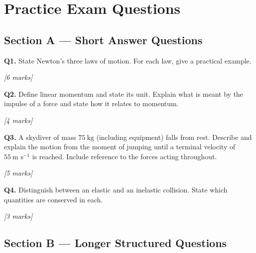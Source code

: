\section{Practice Exam Questions}

\subsection*{Section A --- Short Answer Questions}

\begin{tcolorbox}[colback=white, colframe=midblue, breakable]

\begin{minipage}{\linewidth}
\textbf{Q1.} State Newton's three laws of motion. For each law, give a practical example.
\par\hfill\textit{[6 marks]}
\vspace{5.5cm}
\end{minipage}

\begin{minipage}{\linewidth}
\textbf{Q2.} Define linear momentum and state its unit. Explain what is meant by the impulse of a force and state how it relates to momentum.
\par\hfill\textit{[4 marks]}
\vspace{3.5cm}
\end{minipage}

\begin{minipage}{\linewidth}
\textbf{Q3.} A skydiver of mass $75\ \text{kg}$ (including equipment) falls from rest. Describe and explain the motion from the moment of jumping until a terminal velocity of $55\ \text{m s}^{-1}$ is reached. Include reference to the forces acting throughout.
\par\hfill\textit{[5 marks]}
\vspace{5cm}
\end{minipage}

\begin{minipage}{\linewidth}
\textbf{Q4.} Distinguish between an elastic and an inelastic collision. State which quantities are conserved in each.
\par\hfill\textit{[3 marks]}
\vspace{3.5cm}
\end{minipage}

\end{tcolorbox}

\subsection*{Section B --- Longer Structured Questions}

